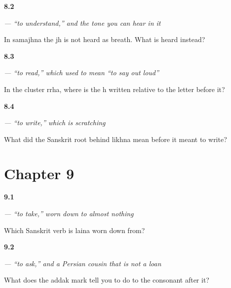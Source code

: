 \noindent\begin{minipage}[t]{\linewidth}
\raggedright
\hypertarget{review-PA-C08-samajhna-tone}{\textbf{8.2}} \emph{ — “to understand,” and the tone you can hear in it}\par
\small In samajhna the jh is not heard as breath. What is heard instead?
\end{minipage}\par\medskip

\noindent\begin{minipage}[t]{\linewidth}
\raggedright
\hypertarget{review-PA-C08-parhna-subjoined}{\textbf{8.3}} \emph{ — “to read,” which used to mean “to say out loud”}\par
\small In the cluster rrha, where is the h written relative to the letter before it?
\end{minipage}\par\medskip

\noindent\begin{minipage}[t]{\linewidth}
\raggedright
\hypertarget{review-PA-C08-likhna-four-roots}{\textbf{8.4}} \emph{ — “to write,” which is scratching}\par
\small What did the Sanskrit root behind likhna mean before it meant to write?
\end{minipage}\par\medskip

\section*{Chapter 9}

\noindent\begin{minipage}[t]{\linewidth}
\raggedright
\hypertarget{review-PA-C09-laina-labhate}{\textbf{9.1}} \emph{ — “to take,” worn down to almost nothing}\par
\small Which Sanskrit verb is laina worn down from?
\end{minipage}\par\medskip

\noindent\begin{minipage}[t]{\linewidth}
\raggedright
\hypertarget{review-PA-C09-puchhna-addak}{\textbf{9.2}} \emph{ — “to ask,” and a Persian cousin that is not a loan}\par
\small What does the addak mark tell you to do to the consonant after it?
\end{minipage}\par\medskip

